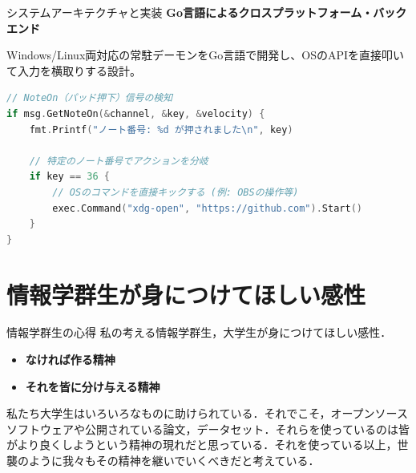 \documentclass[11pt, aspectratio=169]{beamer}
\begin{document}
\begin{frame}[fragile]{システムアーキテクチャと実装}
  \textbf{Go言語によるクロスプラットフォーム・バックエンド}
  
  Windows/Linux両対応の常駐デーモンをGo言語で開発し、OSのAPIを直接叩いて入力を横取りする設計。

  \vspace{1em}
  \begin{lstlisting}[language=Go, caption=MIDI信号の傍受とOSコマンド実行のコアロジック]
// NoteOn（パッド押下）信号の検知
if msg.GetNoteOn(&channel, &key, &velocity) {
    fmt.Printf("ノート番号: %d が押されました\n", key)
    
    // 特定のノート番号でアクションを分岐
    if key == 36 {
        // OSのコマンドを直接キックする (例: OBSの操作等)
        exec.Command("xdg-open", "https://github.com").Start()
    }
}
  \end{lstlisting}
\end{frame}

\section{情報学群生が身につけてほしい感性}

\begin{frame}{情報学群生の心得}
  私の考える情報学群生，大学生が身につけてほしい感性．

  \begin{itemize}
    \item \textbf{なければ作る精神}
    \item \textbf{それを皆に分け与える精神}
  \end{itemize}

  私たち大学生はいろいろなものに助けられている．それでこそ，オープンソースソフトウェアや公開されている論文，データセット．それらを使っているのは皆がより良くしようという精神の現れだと思っている．それを使っている以上，世襲のように我々もその精神を継いでいくべきだと考えている．
\end{frame}
\end{document}
